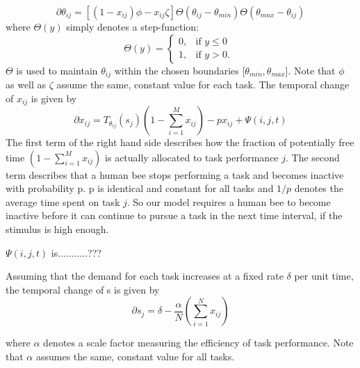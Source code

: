\begin{equation} 
\partial \theta_{ij} = [(1-x_{ij})\phi-x_{ij}\zeta]\Theta(\theta_{ij}-\theta_{min})\Theta(\theta_{max}-\theta_{ij})
\end{equation}
where $\Theta(y)$ simply denotes a step-function:
\begin{equation}
\Theta(y) = \begin{cases}
  0,  & \text{if $y \le 0$ }\\
  1, & \text{if $y > 0.$}
\end{cases}
\end{equation}
$\Theta$ is used to maintain $\theta_{ij}$ within the chosen boundaries [$\theta_{min}, \theta_{max}$]. Note that $\phi$ as well as $\zeta$ assume the same, constant value for each task. The temporal change of $x_{ij}$ is given by
\begin{equation} 
\partial x_{ij}= T_{\theta_{ij}}(s_{j})(1-\sum \limits_{i=1}^{M}x_{ij})-px_{ij}+\Psi(i,j,t)
\end{equation} 
The first term of the right hand side describes how the fraction of potentially free time $(1-\sum \limits_{i=1}^{M}x_{ij})$ is actually allocated to task performance $j$. The second term describes that a human bee stops performing a task and becomes inactive with probability p. p is identical and constant for all tasks and $1/p$ denotes the average time spent on task $j$. So our model requires a human bee to become inactive before it can continue to pursue a task in the next time interval, if the stimulus is high enough.

$\Psi(i,j,t)$ is...........???

Assuming that the demand for each task increases at a fixed rate $\delta$ per unit time, the temporal change of s is given by
\begin{equation}
\partial s_{j}=\delta - \frac{\alpha}{N}(\sum \limits_{i=1}^{N}x_{ij})
\end{equation}

where $\alpha$ denotes a scale factor measuring the efficiency of task performance. Note that $\alpha$ assumes the same, constant value for all tasks.



